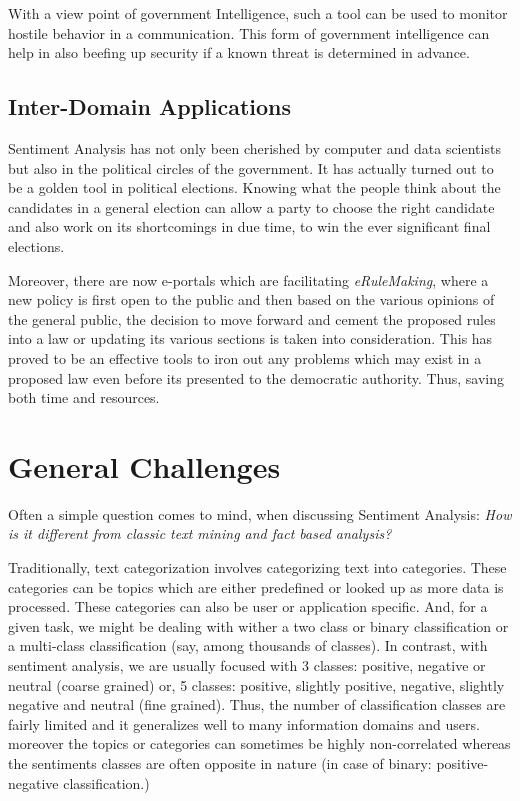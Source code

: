 With a view point of government  Intelligence, such a tool can be used to monitor hostile behavior in a communication. This form of government intelligence can help in also beefing up security if a known threat is determined in advance.

\subsection{Inter-Domain Applications}
Sentiment Analysis has not only been cherished by computer and data scientists but also in the political circles of the government. It has actually turned out to be a golden tool in political elections. Knowing what the people think about the candidates in a general election can allow a party to choose the right candidate and also work on its shortcomings in due time, to win the ever significant final elections. 

Moreover, there are now e-portals which are facilitating \textit{eRuleMaking}, where a new policy is first open to the public and then based on the various opinions of the general public, the decision to move forward and cement the proposed rules into a law or updating its various sections is taken into consideration. This has proved to be an effective tools to iron out any problems which may exist in a proposed law even before its presented to the democratic authority. Thus, saving both time and resources.

\section{General Challenges}

Often a simple question comes to mind, when discussing Sentiment Analysis: \textit{How is it different from classic text mining and fact based analysis?}

Traditionally, text categorization involves categorizing text into categories. These categories can be topics which are either predefined or looked up as more data is processed. These categories can also be user or application specific. And, for a given task, we might be dealing with wither a two class or binary classification or a multi-class classification (say, among thousands of classes).   In contrast, with sentiment analysis, we are usually focused with 3 classes: positive, negative or neutral (coarse grained) or, 5 classes: positive, slightly positive, negative, slightly negative and neutral (fine grained).  Thus, the number of classification classes are fairly limited and it generalizes well to many information domains and users. moreover the topics or categories can sometimes be highly non-correlated whereas the sentiments classes are often opposite in nature (in case of binary: positive- negative classification.)

